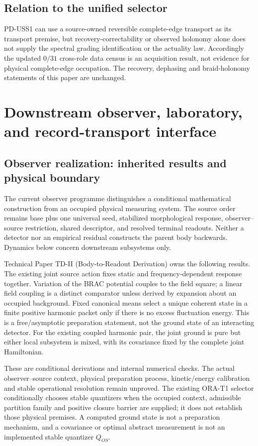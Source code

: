 \documentclass[11pt]{article}
\begin{document}
\subsection*{Relation to the unified selector}

PD-USS1 can use a source-owned reversible complete-edge transport as its
transport premise, but recovery-correctability or observed holonomy alone
does not supply the spectral grading identification or the actuality law.
Accordingly the updated $0/31$ cross-role data census is an acquisition result,
not evidence for physical complete-edge occupation. The recovery, dephasing
and braid-holonomy statements of this paper are unchanged.

\section{Downstream observer, laboratory, and record-transport interface}
\label{sec:downstream-interface-paperiii}

\subsection{Observer realization: inherited results and physical boundary}
\label{sec:observer-update-20260914}
The current observer programme distinguishes a conditional mathematical
construction from an occupied physical measuring system. The source order
remains base plus one universal seed, stabilized morphological response,
observer--source restriction, shared descriptor, and resolved terminal
readouts. Neither a detector nor an empirical residual constructs the parent
body backwards. Dynamics below concern downstream subsystems only.

Technical Paper TD-II (Body-to-Readout Derivation) owns the following
results. The existing joint source action fixes static and frequency-dependent
response together. Variation of the BRAC potential couples to the field
square; a linear field coupling is a distinct comparator unless derived by
expansion about an occupied background. Fixed canonical means select a unique
coherent state in a finite positive harmonic packet only if there is no excess
fluctuation energy. This is a free/asymptotic preparation statement, not the
ground state of an interacting detector. For the existing coupled harmonic
pair, the joint ground is pure but either local subsystem is mixed, with its
covariance fixed by the complete joint Hamiltonian.

These are conditional derivations and internal numerical checks. The actual
observer--source context, physical preparation process, kinetic/energy
calibration and stable operational resolution remain unproved. The existing
ORA-T1 selector conditionally chooses stable quantizers when the occupied
context, admissible partition family and positive closure barrier are supplied;
it does not establish those physical premises. A computed ground state is not
a preparation mechanism, and a covariance or optimal abstract measurement is
not an implemented stable quantizer $Q_{OS}$.
\end{document}

